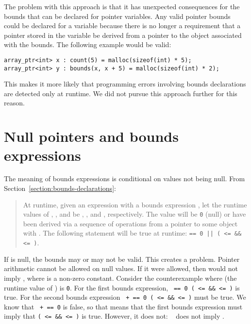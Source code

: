 The problem with this approach is that it has unexpected consequences
for the bounds that can be declared for pointer variables.
Any valid pointer bounds could be declared for a variable because there
is no longer a requirement that a pointer stored in the variable be
derived from a pointer to the object associated with the bounds. The
following example would be valid:

\begin{verbatim}
array_ptr<int> x : count(5) = malloc(sizeof(int) * 5);
array_ptr<int> y : bounds(x, x + 5) = malloc(sizeof(int) * 2);
\end{verbatim}

This makes it more likely that programming errors involving bounds
declarations are detected only at runtime.   We did not pursue
this approach further for this reason.

\section{Null pointers and bounds expressions}

\newcommand{\objectbounds}[2]{\texttt{object\_bounds(#1, #2)}}

The meaning of bounds expressions is conditional on values not being null. 
From Section~\ref{section:bounds-declarations}:
\begin{quote}
At runtime, given an expression  with a bounds expression
, let the runtime
values of , , and  be , ,
and , respectively. The value  will be \texttt{0} (null) or
have been derived via a sequence of operations from a pointer to some
object  with .
The following statement will be true at runtime:
 \texttt{== 0 || ( <= \&\& 
 <= )}. 
\end{quote}

If  is null, the bounds may or may not be valid.
This creates a problem.  Pointer arithmetic cannot be allowed
on null values.  If it were allowed, then
 would
not imply , where  is
a non-zero constant.
Consider the counterexample where  (the runtime value of ) is \texttt{0}.
For the first bounds expression, \texttt{ == 0 \textbar\textbar ( <= 
\&\&  <= )} is true. For the second bounds expression \texttt{ +
 == 0 \textbar\textbar ( <=  \&\&  <=
)} must be true.  We know that \texttt{ +  == 0} is false, so
that means that the first bounds expression
must imply that \texttt{( <=  \&\&  <= )} is true. 
However, it does not: 
\texttt{ \textbar{}\textbar{} } does not imply .

